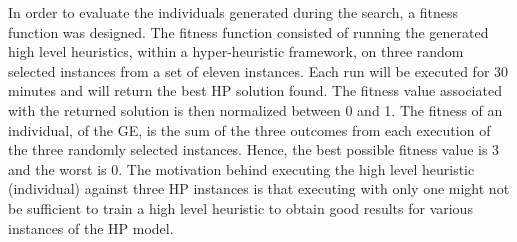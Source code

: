 \documentclass[conference]{IEEEtran}
\begin{document}
In order to evaluate the individuals generated during the search, a fitness function was designed. The fitness function consisted of running the generated high level heuristics, within a hyper-heuristic framework, on three random selected instances from a set of eleven instances. Each run will be executed for 30 minutes and will return the best HP solution found. The fitness value associated with the returned solution is then normalized between 0 and 1. The fitness of an individual, of the GE, is the sum of the three outcomes from each execution of the three randomly selected instances. Hence, the best possible fitness value is 3 and the worst is 0.
 The motivation behind executing the high level heuristic (individual) against three HP instances is that executing with only one might not be sufficient to train a high level heuristic to obtain good results for various instances of the HP model.
\end{document}
